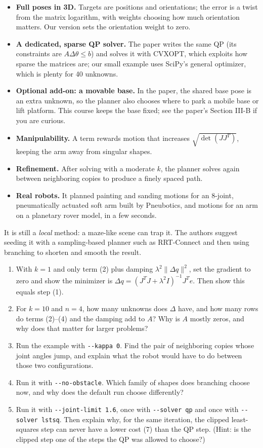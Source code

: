 \begin{itemize}\setlength{\itemsep}{0pt}
\item \textbf{Full poses in 3D.} Targets are positions and orientations; the
error is a twist from the matrix logarithm, with weights choosing how much
orientation matters. Our version sets the orientation weight to zero.
\item \textbf{A dedicated, sparse QP solver.} The paper writes the same QP
(its constraints are $A\Delta\theta\le b$) and solves it with CVXOPT, which
exploits how sparse the matrices are; our small example uses SciPy's general
optimizer, which is plenty for 40 unknowns.
\item \textbf{Optional add-on: a movable base.} In the paper, the shared base
pose is an extra unknown, so the planner also chooses where to park a mobile
base or lift platform. This course keeps the base fixed; see the paper's
Section III-B if you are curious.
\item \textbf{Manipulability.} A term rewards motion that increases
$\sqrt{\det(JJ^T)}$, keeping the arm away from singular shapes.
\item \textbf{Refinement.} After solving with a moderate $k$, the planner
solves again between neighboring copies to produce a finely spaced path.
\item \textbf{Real robots.} It planned painting and sanding motions for an
8-joint, pneumatically actuated soft arm built by Pneubotics, and motions
for an arm on a planetary rover model, in a few seconds.
\end{itemize}
It is still a \emph{local} method: a maze-like scene can trap it. The authors
suggest seeding it with a sampling-based planner such as RRT-Connect and then
using branching to shorten and smooth the result.

\begin{enumerate}
\item With $k=1$ and only term (2) plus damping $\lambda^2\|\Delta q\|^2$,
set the gradient to zero and show the minimizer is
$\Delta q=(J^TJ+\lambda^2I)^{-1}J^Te$. Then show this equals step (1).
\item For $k=10$ and $n=4$, how many unknowns does $\Delta$ have, and how
many rows do terms (2)--(4) and the damping add to $A$? Why is $A$ mostly
zeros, and why does that matter for larger problems?
\item Run the example with \texttt{-{}-kappa 0}. Find the pair of neighboring
copies whose joint angles jump, and explain what the robot would have to do
between those two configurations.
\item Run it with \texttt{-{}-no-obstacle}. Which family of shapes does
branching choose now, and why does the default run choose differently?
\item Run it with \texttt{-{}-joint-limit 1.6}, once with \texttt{-{}-solver qp}
and once with \texttt{-{}-solver lstsq}. Then explain why, for the same
iteration, the clipped least-squares step can never have a lower cost (7)
than the QP step. (Hint: is the clipped step one of the steps the QP was
allowed to choose?)
\end{enumerate}

